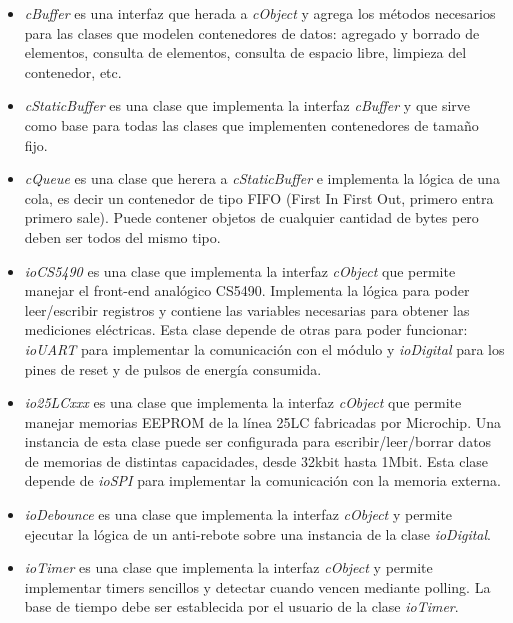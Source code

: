 \begin{itemize}
\item \textit{cBuffer} es una interfaz que herada a \textit{cObject} y agrega los métodos necesarios para las clases que modelen contenedores de datos: agregado y borrado de elementos, consulta de elementos, consulta de espacio libre, limpieza del contenedor, etc.

\item \textit{cStaticBuffer} es una clase que implementa la interfaz \textit{cBuffer} y que sirve como base para todas las clases que implementen contenedores de tamaño fijo.

\item \textit{cQueue} es una clase que herera a \textit{cStaticBuffer} e implementa la lógica de una cola, es decir un contenedor de tipo FIFO (First In First Out, primero entra primero sale). Puede contener objetos de cualquier cantidad de bytes pero deben ser todos del mismo tipo.

\item \textit{ioCS5490} es una clase que implementa la interfaz \textit{cObject} que permite manejar el front-end analógico CS5490. Implementa la lógica para poder leer/escribir registros y contiene las variables necesarias para obtener las mediciones eléctricas. Esta clase depende de otras para poder funcionar: \textit{ioUART} para implementar la comunicación con el módulo y \textit{ioDigital} para los pines de reset y de pulsos de energía consumida.

\item \textit{io25LCxxx} es una clase que implementa la interfaz \textit{cObject} que permite manejar memorias EEPROM de la línea 25LC fabricadas por Microchip. Una instancia de esta clase puede ser configurada para escribir/leer/borrar datos de memorias de distintas capacidades, desde 32kbit  hasta 1Mbit. Esta clase depende de \textit{ioSPI} para implementar la comunicación con la memoria externa.

\item \textit{ioDebounce} es una clase que implementa la interfaz \textit{cObject} y permite ejecutar la lógica de un anti-rebote sobre una instancia de la clase \textit{ioDigital}.

\item \textit{ioTimer} es una clase que implementa la interfaz \textit{cObject} y permite implementar timers sencillos y detectar cuando vencen mediante polling. La base de tiempo debe ser establecida por el usuario de la clase \textit{ioTimer}.

\end{itemize}

